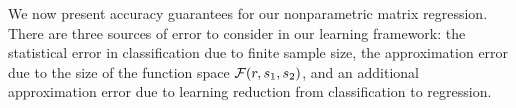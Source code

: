 \documentclass[11pt]{article}
\theoremstyle{definition}
\newtheorem{corollary}{Corollary}[section]
\def\bayesS{S_{\textup{bayes}}}
\begin{document}




We now present accuracy guarantees for our nonparametric matrix regression.  There are three sources of error to consider in our learning framework: the statistical error in classification due to finite sample size, the approximation error due to the size of the function space $\mathcal{F}(r,s_1,s_2)$, and an additional approximation error due to learning reduction from classification to regression.
\end{document}
